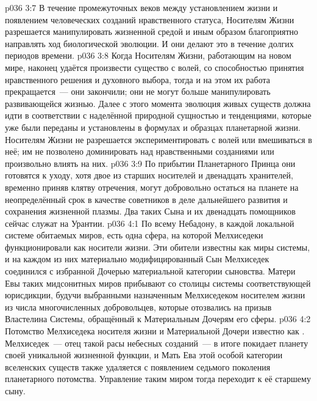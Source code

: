 \vs p036 3:7 В течение промежуточных веков между установлением жизни и появлением человеческих созданий нравственного статуса, Носителям Жизни разрешается манипулировать жизненной средой и иным образом благоприятно направлять ход биологической эволюции. И они делают это в течение долгих периодов времени.
\vs p036 3:8 Когда Носителям Жизни, работающим на новом мире, наконец удаётся произвести существо с волей, со способностью принятия нравственного решения и духовного выбора, тогда и на этом их работа прекращается~--- они закончили; они не могут больше манипулировать развивающейся жизнью. Далее с этого момента эволюция живых существ должна идти в соответствии с наделённой природной сущностью и тенденциями, которые уже были переданы и установлены в формулах и образцах планетарной жизни. Носителям Жизни не разрешается экспериментировать с волей или вмешиваться в неё; им не позволено доминировать над нравственными созданиями или произвольно влиять на них.
\vs p036 3:9 По прибытии Планетарного Принца они готовятся к уходу, хотя двое из старших носителей и двенадцать хранителей, временно приняв клятву отречения, могут добровольно остаться на планете на неопределённый срок в качестве советников в деле дальнейшего развития и сохранения жизненной плазмы. Два таких Сына и их двенадцать помощников сейчас служат на Урантии.
\vs p036 4:1 По всему Небадону, в каждой локальной системе обитаемых миров, есть одна сфера, на которой Мелхиседеки функционировали как носители жизни. Эти обители известны как  миры системы, и на каждом из них материально модифицированный Сын Мелхиседек соединился с избранной Дочерью материальной категории сыновства. Матери Евы таких мидсонитных миров прибывают со столицы системы соответствующей юрисдикции, будучи выбранными назначенным Мелхиседеком носителем жизни из числа многочисленных добровольцев, которые отозвались на призыв Властелина Системы, обращённый к Материальным Дочерям его сферы.
\vs p036 4:2 Потомство Мелхиседека носителя жизни и Материальной Дочери известно как . Мелхиседек~--- отец такой расы небесных созданий~--- в итоге покидает планету своей уникальной жизненной функции, и Мать Ева этой особой категории вселенских существ также удаляется с появлением седьмого поколения планетарного потомства. Управление таким миром тогда переходит к её старшему сыну.
